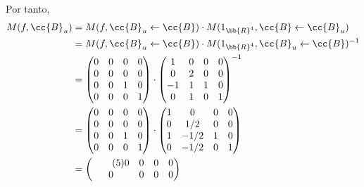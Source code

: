 \documentclass[12pt]{article}
\begin{document}
\begin{ejercicio}[2.5 puntos]
\begin{enumerate}
            Por tanto,
            \begin{align*}
                M(f, \cc{B}_u) &= M(f, \cc{B}_u \leftarrow \cc{B}) \cdot M(1_{\bb{R}^4}, \cc{B} \leftarrow \cc{B}_u) \\
                &= M(f, \cc{B}_u \leftarrow \cc{B}) \cdot M(1_{\bb{R}^4}, \cc{B}_u \leftarrow \cc{B})^{-1} \\
                &= 
                \begin{pmatrix}
                    0 & 0 & 0 & 0 \\
                    0 & 0 & 0 & 0 \\
                    0 & 0 & 1 & 0 \\
                    0 & 0 & 0 & 1 \\
                \end{pmatrix}
                \cdot
                \begin{pmatrix}
                    1 & 0 & 0 & 0 \\
                    0 & 2 & 0 & 0 \\
                    -1 & 1 & 1 & 0 \\
                    0 & 1 & 0 & 1 \\
                \end{pmatrix}^{-1}\\
                &= 
                \begin{pmatrix}
                    0 & 0 & 0 & 0 \\
                    0 & 0 & 0 & 0 \\
                    0 & 0 & 1 & 0 \\
                    0 & 0 & 0 & 1 \\
                \end{pmatrix}
                \cdot
                \begin{pmatrix}
                    1 & 0 & 0 & 0 \\
                    0 & 1/2 & 0 & 0 \\
                    1 & -1/2 & 1 & 0 \\
                    0 & -1/2 & 0 & 1 \\
                \end{pmatrix}\\
                &= 
                \begin{pmatrix} \tag{5} \label{eq_5}
                    0 & 0 & 0 & 0 \\
                    0 & 0 & 0 & 0 \\

\end{pmatrix}
\end{align*}
\end{enumerate}
\end{ejercicio}
\end{document}
